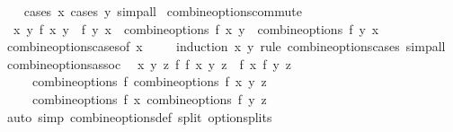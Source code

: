 \begin{isabellebody}
%
\isadelimproof
\ \ %
\endisadelimproof
%
\isatagproof
{}\isamarkupfalse%
\ {\isacharparenleft}{\kern0pt}cases\ x{\isacharsemicolon}{\kern0pt}\ cases\ y{\isacharparenright}{\kern0pt}\ simp{\isacharunderscore}{\kern0pt}all%
\endisatagproof
{\isafoldproof}%
%
\isadelimproof
\isanewline
%
\endisadelimproof
\isanewline
{}\isamarkupfalse%
\ combine{\isacharunderscore}{\kern0pt}options{\isacharunderscore}{\kern0pt}commute{\isacharcolon}{\kern0pt}\ \isanewline
\ \ {\isachardoublequoteopen}{\isacharparenleft}{\kern0pt}{\isasymAnd}x\ y{\isachardot}{\kern0pt}\ f\ x\ y\ {\isacharequal}{\kern0pt}\ f\ y\ x{\isacharparenright}{\kern0pt}\ {\isasymLongrightarrow}\ combine{\isacharunderscore}{\kern0pt}options\ f\ x\ y\ {\isacharequal}{\kern0pt}\ combine{\isacharunderscore}{\kern0pt}options\ f\ y\ x{\isachardoublequoteclose}\isanewline
%
\isadelimproof
\ \ %
\endisadelimproof
%
\isatagproof
{}\isamarkupfalse%
\ combine{\isacharunderscore}{\kern0pt}options{\isacharunderscore}{\kern0pt}cases{\isacharbrackleft}{\kern0pt}of\ x\ {\isacharbrackright}{\kern0pt}\isanewline
\ \ \isamarkupfalse%
\ {\isacharparenleft}{\kern0pt}induction\ x\ y\ rule{\isacharcolon}{\kern0pt}\ combine{\isacharunderscore}{\kern0pt}options{\isacharunderscore}{\kern0pt}cases{\isacharparenright}{\kern0pt}\ simp{\isacharunderscore}{\kern0pt}all%
\endisatagproof
{\isafoldproof}%
%
\isadelimproof
\isanewline
%
\endisadelimproof
\isanewline
{}\isamarkupfalse%
\ combine{\isacharunderscore}{\kern0pt}options{\isacharunderscore}{\kern0pt}assoc{\isacharcolon}{\kern0pt}\isanewline
\ \ {\isachardoublequoteopen}{\isacharparenleft}{\kern0pt}{\isasymAnd}x\ y\ z{\isachardot}{\kern0pt}\ f\ {\isacharparenleft}{\kern0pt}f\ x\ y{\isacharparenright}{\kern0pt}\ z\ {\isacharequal}{\kern0pt}\ f\ x\ {\isacharparenleft}{\kern0pt}f\ y\ z{\isacharparenright}{\kern0pt}{\isacharparenright}{\kern0pt}\ {\isasymLongrightarrow}\ \isanewline
\ \ \ \ \ combine{\isacharunderscore}{\kern0pt}options\ f\ {\isacharparenleft}{\kern0pt}combine{\isacharunderscore}{\kern0pt}options\ f\ x\ y{\isacharparenright}{\kern0pt}\ z\ {\isacharequal}{\kern0pt}\isanewline
\ \ \ \ \ combine{\isacharunderscore}{\kern0pt}options\ f\ x\ {\isacharparenleft}{\kern0pt}combine{\isacharunderscore}{\kern0pt}options\ f\ y\ z{\isacharparenright}{\kern0pt}{\isachardoublequoteclose}\isanewline
%
\isadelimproof
\ \ %
\endisadelimproof
%
\isatagproof
{}\isamarkupfalse%
\ {\isacharparenleft}{\kern0pt}auto\ simp{\isacharcolon}{\kern0pt}\ combine{\isacharunderscore}{\kern0pt}options{\isacharunderscore}{\kern0pt}def\ split{\isacharcolon}{\kern0pt}\ option{\isachardot}{\kern0pt}splits{\isacharparenright}{\kern0pt}%

\end{isabellebody}
